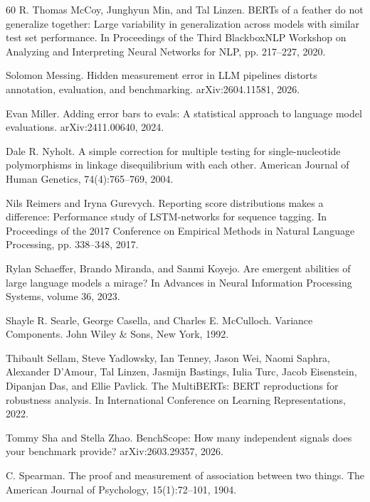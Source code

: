 \begin{thebibliography}{60}
R. Thomas McCoy, Junghyun Min, and Tal Linzen. BERTs of a feather do not generalize together: Large variability in generalization across models with similar test set performance. In Proceedings of the Third BlackboxNLP Workshop on Analyzing and Interpreting Neural Networks for NLP, pp. 217--227, 2020.

Solomon Messing. Hidden measurement error in LLM pipelines distorts annotation, evaluation, and benchmarking. arXiv:2604.11581, 2026.

Evan Miller. Adding error bars to evals: A statistical approach to language model evaluations. arXiv:2411.00640, 2024.

Dale R. Nyholt. A simple correction for multiple testing for single-nucleotide polymorphisms in linkage disequilibrium with each other. American Journal of Human Genetics, 74(4):765--769, 2004.

Nils Reimers and Iryna Gurevych. Reporting score distributions makes a difference: Performance study of LSTM-networks for sequence tagging. In Proceedings of the 2017 Conference on Empirical Methods in Natural Language Processing, pp. 338--348, 2017.

Rylan Schaeffer, Brando Miranda, and Sanmi Koyejo. Are emergent abilities of large language models a mirage? In Advances in Neural Information Processing Systems, volume 36, 2023.

Shayle R. Searle, George Casella, and Charles E. McCulloch. Variance Components. John Wiley \& Sons, New York, 1992.

Thibault Sellam, Steve Yadlowsky, Ian Tenney, Jason Wei, Naomi Saphra, Alexander D'Amour, Tal Linzen, Jasmijn Bastings, Iulia Turc, Jacob Eisenstein, Dipanjan Das, and Ellie Pavlick. The MultiBERTs: BERT reproductions for robustness analysis. In International Conference on Learning Representations, 2022.

Tommy Sha and Stella Zhao. BenchScope: How many independent signals does your benchmark provide? arXiv:2603.29357, 2026.

C. Spearman. The proof and measurement of association between two things. The American Journal of Psychology, 15(1):72--101, 1904.


\end{thebibliography}
